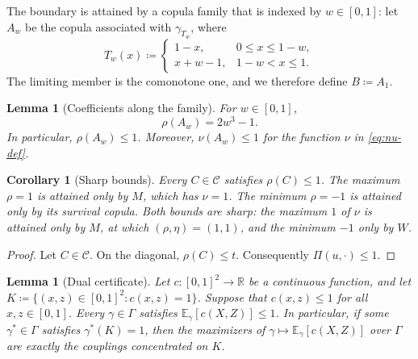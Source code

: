 \documentclass{article}
\newcommand{\E}{\mathbb{E}}
\newcommand{\CC}{\mathcal{C}}
\newcommand{\Gam}{\Gamma}
\newcommand{\R}{\mathbb{R}}
\newtheorem{lemma}[theorem]{Lemma}
\newtheorem{corollary}[theorem]{Corollary}
\begin{document}
The boundary is attained by a copula family that is indexed by $w\in[0,1]$: let $A_w$ be the copula associated with $\gamma_{T_w}$, where
\begin{equation}
  \label{eq:Tw-def}
  T_w(x)\coloneqq
  \begin{cases}
    1-x, & 0\le x\le1-w,\\
    x+w-1, & 1-w<x\le1.
  \end{cases}
\end{equation}
The limiting member is the comonotone one, and we therefore define $B\coloneqq A_1$.

\begin{lemma}[Coefficients along the family]
\label{lem:values}
For $w\in[0,1]$,
\begin{equation}
  \label{eq:values}
  \rho(A_w)=2w^3-1.
\end{equation}
In particular, $\rho(A_w)\le1$.
Moreover, $\nu(A_w)\le1$ for the function $\nu$ in \eqref{eq:nu-def}.
\end{lemma}

\begin{corollary}[Sharp bounds]
\label{cor:bounds}
Every $C\in\CC$ satisfies $\rho(C)\le1$.
The maximum $\rho=1$ is attained only by $M$, which has $\nu=1$.
The minimum $\rho=-1$ is attained only by its survival copula.
Both bounds are sharp: the maximum $1$ of $\nu$ is attained only by $M$, at which $(\rho,\eta)=(1,1)$, and the minimum $-1$ only by $W$.
\end{corollary}

\begin{proof}
Let $C\in\CC$.
On the diagonal, $\rho(C)\le t$.
Consequently $\Pi(u,\cdot)\le1$.
\end{proof}

\begin{lemma}[Dual certificate]
\label{lem:dual}
Let $c:[0,1]^2\to\R$ be a continuous function, and let $K\coloneqq\{(x,z)\in[0,1]^2:c(x,z)=1\}$.
Suppose that $c(x,z)\le1$ for all $x,z\in[0,1]$.
Every $\gamma\in\Gam$ satisfies $\E_\gamma[c(X,Z)]\le1$.
In particular, if some $\gamma^*\in\Gam$ satisfies $\gamma^*(K)=1$, then the maximizers of $\gamma\mapsto\E_\gamma[c(X,Z)]$ over $\Gam$ are exactly the couplings concentrated on $K$.
\end{lemma}
\end{document}
